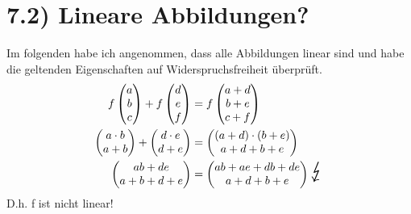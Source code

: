 \documentclass[titlepage]{article}
\newcommand{\1}{\mathbb{1}}
\newcommand{\0}{\mathbb{0}}
\begin{document}
	\section*{7.2) Lineare Abbildungen?}
		Im folgenden habe ich angenommen, dass alle Abbildungen linear sind und habe die geltenden Eigenschaften auf Widerspruchsfreiheit überprüft.
		\begin{align*}
			f\begin{pmatrix}a\\b\\c\end{pmatrix}
			+
			f\begin{pmatrix}d\\e\\f\end{pmatrix}
			&=
			f\begin{pmatrix}a+d\\b+e\\c+f\end{pmatrix}
			\\
			\begin{pmatrix}a\cdot b\\a+b\end{pmatrix}
			+
			\begin{pmatrix}d\cdot e\\d+e\end{pmatrix}
			&=
			\begin{pmatrix}(a+d)\cdot(b+e)\\a+d+b+e\end{pmatrix}
			\\
			\begin{pmatrix}ab+de\\a+b+d+e\end{pmatrix}
			&=
			\begin{pmatrix}ab+ae+db+de\\a+d+b+e\end{pmatrix}\scalebox{2}{$\lightning$}
		\end{align*}
		D.h. f ist nicht linear!
\end{document}
